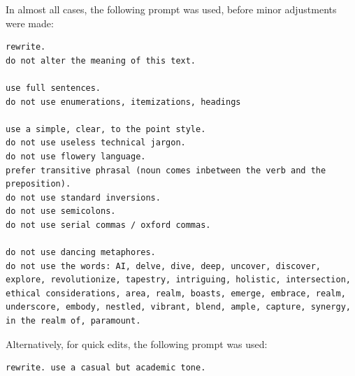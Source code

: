 \documentclass[a4paper, oneside]{discothesis}
\begin{document}
In almost all cases, the following prompt was used, before minor adjustments were made:

\begin{verbatim}
rewrite.
do not alter the meaning of this text.

use full sentences.
do not use enumerations, itemizations, headings

use a simple, clear, to the point style.
do not use useless technical jargon.
do not use flowery language.
prefer transitive phrasal (noun comes inbetween the verb and the preposition).
do not use standard inversions.
do not use semicolons.
do not use serial commas / oxford commas.

do not use dancing metaphores.
do not use the words: AI, delve, dive, deep, uncover, discover, explore, revolutionize, tapestry, intriguing, holistic, intersection, ethical considerations, area, realm, boasts, emerge, embrace, realm, underscore, embody, nestled, vibrant, blend, ample, capture, synergy, in the realm of, paramount.
\end{verbatim}

Alternatively, for quick edits, the following prompt was used:

\begin{verbatim}
rewrite. use a casual but academic tone.
\end{verbatim}
\end{document}
